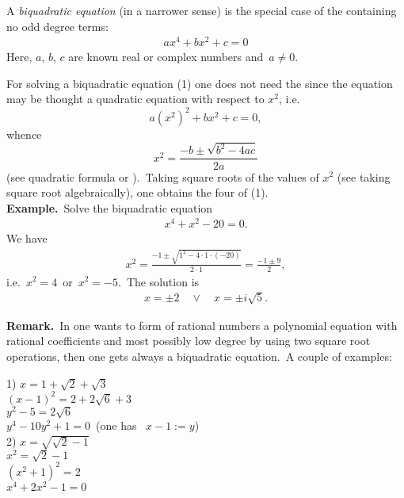 \documentclass[12pt]{article}
\theoremstyle{definition}
\begin{document}
A {\em biquadratic equation} (in a narrower sense) is the special case of the  containing no odd degree terms:
\begin{align}
ax^4+bx^2+c = 0
\end{align}
Here, $a$, $b$, $c$ are known real or complex numbers and\, $a \neq 0$.

For solving a biquadratic equation (1) one does not need the  since the equation may be thought a quadratic equation with respect to $x^2$, i.e.
$$a(x^2)^2+bx^2+c = 0,$$
whence
$$x^2 = \frac{-b\pm\sqrt{b^2-4ac}}{2a}$$
(see quadratic formula or ).\, Taking square roots of the values of $x^2$ (see taking square root algebraically), one obtains the four  of (1).\\

\textbf{Example.}\, Solve the biquadratic equation
\begin{align}
x^4+x^2-20 = 0.
\end{align}
We have
\begin{align}
x^2 = \frac{-1\pm\sqrt{1^2-4\cdot1\cdot(-20)}}{2\cdot1} = \frac{-1\pm9}{2},
\end{align}
i.e.\, $x^2 = 4$\, or\, $x^2 = -5$.\, The solution is
\begin{align}
x = \pm2 \quad \lor \quad x = \pm i\sqrt{5}.
\end{align}

\textbf{Remark.}\, In one wants to form of rational numbers a polynomial equation with rational coefficients and most possibly low degree by using two square root operations, then one gets always a biquadratic equation.\, A couple of examples:

1) $x = 1+\sqrt2+\sqrt3$\\
$(x-1)^2 = 2+2\sqrt{6}+3$\\
$y^2-5 = 2\sqrt{6}$\\
$y^4-10y^2+1 = 0$\, (one has \, $x-1 := y$)\\

2) $x = \sqrt{\sqrt{2}-1}$\\
$x^2 = \sqrt{2}-1$\\
$(x^2+1)^2 = 2$\\
$x^4+2x^2-1 = 0$


\end{document}

